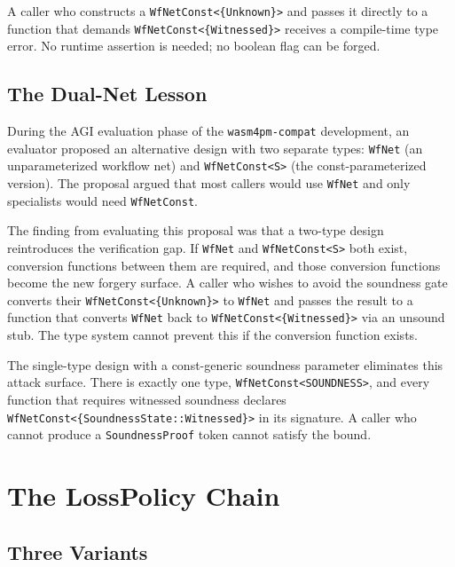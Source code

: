 A caller who constructs a \texttt{WfNetConst<\{Unknown\}>} and passes it
directly to a function that demands \texttt{WfNetConst<\{Witnessed\}>} receives
a compile-time type error. No runtime assertion is needed; no boolean flag can
be forged.

\subsection{The Dual-Net Lesson}

During the AGI evaluation phase of the \texttt{wasm4pm-compat} development,
an evaluator proposed an alternative design with two separate types:
\texttt{WfNet} (an unparameterized workflow net) and \texttt{WfNetConst<S>}
(the const-parameterized version). The proposal argued that most callers would
use \texttt{WfNet} and only specialists would need \texttt{WfNetConst}.

The finding from evaluating this proposal was that a two-type design
reintroduces the verification gap. If \texttt{WfNet} and
\texttt{WfNetConst<S>} both exist, conversion functions between them are
required, and those conversion functions become the new forgery surface. A
caller who wishes to avoid the soundness gate converts their
\texttt{WfNetConst<\{Unknown\}>} to \texttt{WfNet} and passes the result to a
function that converts \texttt{WfNet} back to \texttt{WfNetConst<\{Witnessed\}>}
via an unsound stub. The type system cannot prevent this if the conversion
function exists.

The single-type design with a const-generic soundness parameter eliminates this
attack surface. There is exactly one type, \texttt{WfNetConst<SOUNDNESS>}, and
every function that requires witnessed soundness declares
\texttt{WfNetConst<\{SoundnessState::Witnessed\}>} in its signature. A caller
who cannot produce a \texttt{SoundnessProof} token cannot satisfy the bound.

\section{The LossPolicy Chain}
\label{sec:arch-losspolicy}

\subsection{Three Variants}

